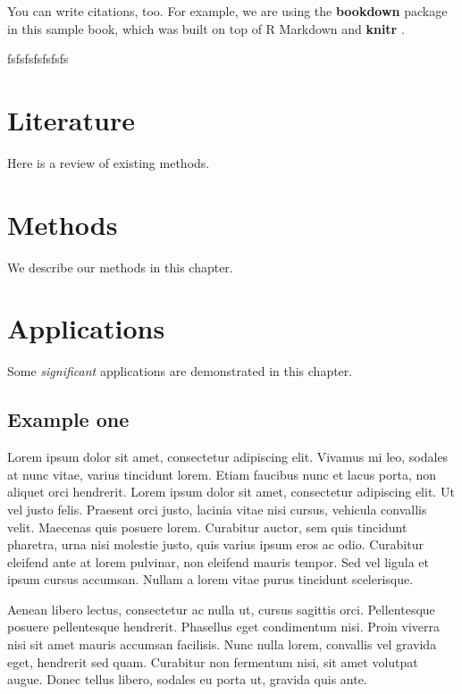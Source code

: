 \documentclass[
]{book}
\begin{document}
You can write citations, too. For example, we are using the \textbf{bookdown} package \citep{R-bookdown} in this sample book, which was built on top of R Markdown and \textbf{knitr} \citep{xie2015}.

fsfsfsfsfsfsfs

\hypertarget{literature}{%
\chapter{Literature}\label{literature}}

Here is a review of existing methods.

\hypertarget{methods}{%
\chapter{Methods}\label{methods}}

We describe our methods in this chapter.

\hypertarget{applications}{%
\chapter{Applications}\label{applications}}

Some \emph{significant} applications are demonstrated in this chapter.

\hypertarget{example-one}{%
\section{Example one}\label{example-one}}

Lorem ipsum dolor sit amet, consectetur adipiscing elit. Vivamus mi leo, sodales at nunc vitae, varius tincidunt lorem. Etiam faucibus nunc et lacus porta, non aliquet orci hendrerit. Lorem ipsum dolor sit amet, consectetur adipiscing elit. Ut vel justo felis. Praesent orci justo, lacinia vitae nisi cursus, vehicula convallis velit. Maecenas quis posuere lorem. Curabitur auctor, sem quis tincidunt pharetra, urna nisi molestie justo, quis varius ipsum eros ac odio. Curabitur eleifend ante at lorem pulvinar, non eleifend mauris tempor. Sed vel ligula et ipsum cursus accumsan. Nullam a lorem vitae purus tincidunt scelerisque.

Aenean libero lectus, consectetur ac nulla ut, cursus sagittis orci. Pellentesque posuere pellentesque hendrerit. Phasellus eget condimentum nisi. Proin viverra nisi sit amet mauris accumsan facilisis. Nunc nulla lorem, convallis vel gravida eget, hendrerit sed quam. Curabitur non fermentum nisi, sit amet volutpat augue. Donec tellus libero, sodales eu porta ut, gravida quis ante.
\end{document}
